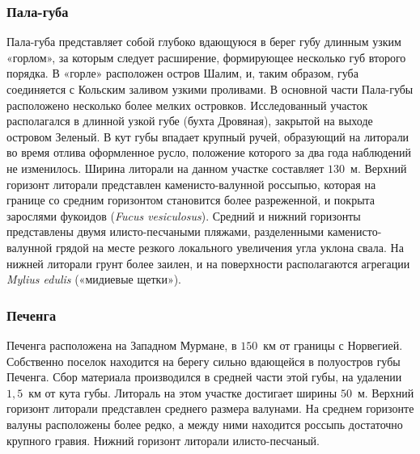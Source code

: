 \subsubsection{Пала-губа}
Пала-губа   представляет   собой   глубоко   вдающуюся   в   берег   губу   длинным   узким «горлом», за которым следует расширение, формирующее несколько губ второго порядка. 
В «горле» расположен остров Шалим, и, таким образом, губа соединяется с Кольским заливом узкими   проливами.   
В   основной   части   Пала-губы   расположено   несколько   более   мелких островков. 
Исследованный участок располагался в длинной узкой губе (бухта Дровяная), закрытой на выходе островом Зеленый.
В кут губы впадает крупный ручей, образующий на литорали во время отлива оформленное русло, положение которого за два года наблюдений не изменилось.
Ширина литорали на данном участке составляет  $130$~м. 
Верхний горизонт литорали представлен   каменисто-валунной   россыпью,   которая   на   границе   со   средним   горизонтом становится более разреженной, и покрыта зарослями фукоидов ({\it Fucus vesiculosus}). 
Средний и нижний   горизонты   представлены   двумя   илисто-песчаными   пляжами,   разделенными каменисто-валунной грядой на месте резкого локального увеличения угла уклона свала. 
На нижней литорали грунт более заилен, и на поверхности располагаются агрегации {\it Mylius edulis} («мидиевые щетки»).

\subsubsection{Печенга}
Печенга расположена на Западном Мурмане, в $150$~км от границы с Норвегией. 
Собственно поселок находится на берегу сильно вдающейся в полуостров губы Печенга. 
Сбор материала производился в средней части этой губы, на удалении $1,5$~км от кута губы. 
Литораль на этом участке достигает ширины $50$~м. 
Верхний горизонт литорали представлен среднего размера валунами. 
На среднем горизонте валуны расположены более редко, а между ними находится россыпь достаточно крупного гравия. 
Нижний горизонт литорали илисто-песчаный. 

